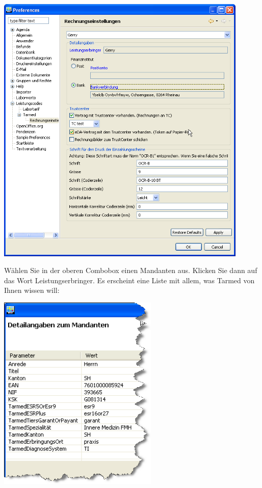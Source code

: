 \includegraphics[width=0.9\textwidth]{images/tarmed2}

Wählen Sie in der oberen Combobox einen Mandanten aus. Klicken Sie dann auf das Wort Leistungserbringer.
Es erscheint eine Liste mit allem, was Tarmed von Ihnen wissen will:

\includegraphics[width=3in]{images/tarmed3}

